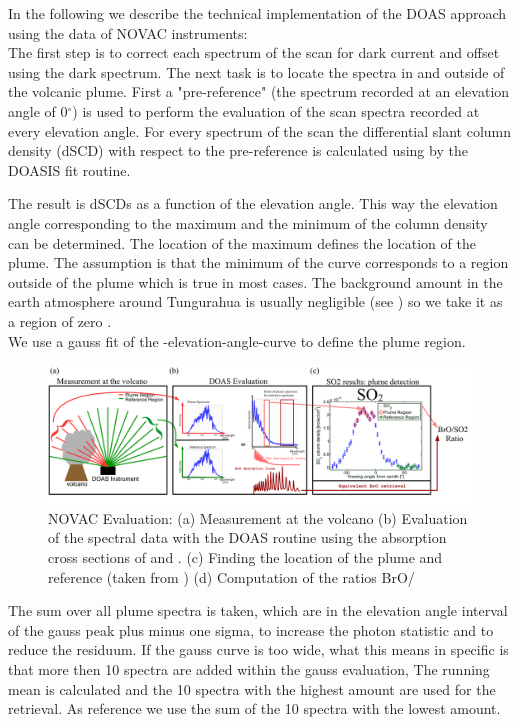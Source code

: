 %
In the following we describe the technical implementation of the DOAS approach using the data of NOVAC instruments:\\
%
The first step is to correct each spectrum of the scan for dark current and offset using the dark spectrum.
The next task is to locate the spectra in and outside of the volcanic plume.
First a "pre-reference" (the spectrum recorded at an elevation angle of  0$^{\circ} $) is used to perform the evaluation of the scan spectra recorded at every elevation angle.
For every spectrum of the scan the  differential slant column density (dSCD) with respect to the pre-reference is calculated using  by the DOASIS fit routine.

The result is  dSCDs as a function of the elevation angle. This way the elevation angle corresponding to the maximum and the minimum of the  column density can be determined. The location of the  maximum defines the location of the plume. The assumption is that the minimum of the  curve corresponds to a region outside of the plume which is true in most cases. The background  amount in the earth atmosphere around Tungurahua is usually negligible (see  ) so we take it as a region of zero . \\
We use a gauss fit of the -elevation-angle-curve to define the plume region.
%
\begin{figure}
	\centering
	\includegraphics[width=1\linewidth]{Bilder/NOVAC_Eval}
	\caption{NOVAC Evaluation: (a) Measurement at the volcano (b) Evaluation of the spectral data with the DOAS routine using the absorption cross sections of   and . (c) Finding the location of the plume and reference (taken from \cite{WarnachSimon}) (d) Computation of the ratios BrO/}
	\label{fig:NOVAC_Eval}
\end{figure}
The sum over all plume spectra is taken, which are in the elevation angle interval of the gauss peak plus minus one sigma, to increase the photon statistic and to reduce the residuum. If the gauss curve is too wide, what this means in specific is that more then 10 spectra are added within the gauss evaluation, The running mean is calculated and the 10 spectra with the highest  amount are used for the retrieval. As reference we use the sum of the 10 spectra with the lowest  amount.\\
